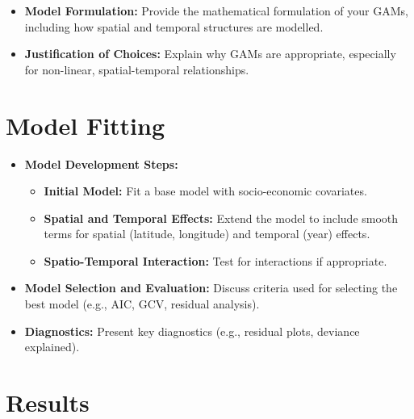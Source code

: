\documentclass[
  11pt,
  a4paper,11pt]{article}
\providecommand{\tightlist}{%
  \setlength{\itemsep}{0pt}\setlength{\parskip}{0pt}}
\begin{document}
\begin{itemize}
\tightlist
\item
  \textbf{Model Formulation:} Provide the mathematical formulation of
  your GAMs, including how spatial and temporal structures are modelled.
\end{itemize}

\begin{itemize}
\tightlist
\item
  \textbf{Justification of Choices:} Explain why GAMs are appropriate,
  especially for non-linear, spatial-temporal relationships.
\end{itemize}

\section{Model Fitting}\label{model-fitting}

\begin{itemize}
\item
  \textbf{Model Development Steps:}

  \begin{itemize}
  \item
    \textbf{Initial Model:} Fit a base model with socio-economic
    covariates.
  \item
    \textbf{Spatial and Temporal Effects:} Extend the model to include
    smooth terms for spatial (latitude, longitude) and temporal (year)
    effects.
  \item
    \textbf{Spatio-Temporal Interaction:} Test for interactions if
    appropriate.
  \end{itemize}
\end{itemize}

\begin{itemize}
\tightlist
\item
  \textbf{Model Selection and Evaluation:} Discuss criteria used for
  selecting the best model (e.g., AIC, GCV, residual analysis).
\end{itemize}

\begin{itemize}
\tightlist
\item
  \textbf{Diagnostics:} Present key diagnostics (e.g., residual plots,
  deviance explained).
\end{itemize}

\section{Results}\label{results}
\end{document}

